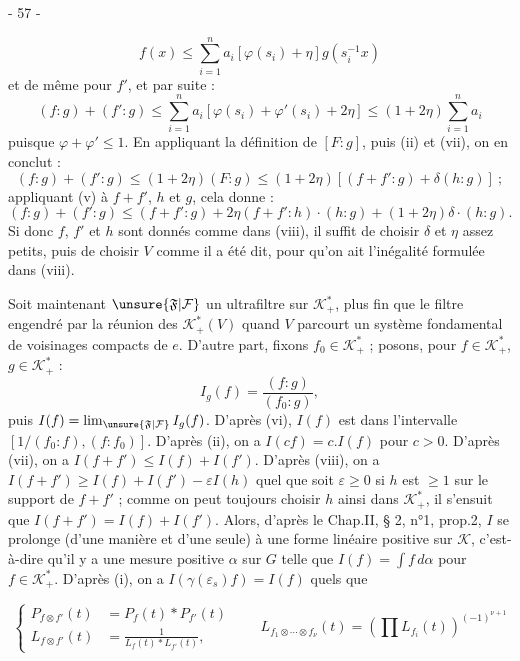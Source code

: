 
\begin{center}- 57 -\end{center}

\[
f(x)\leq\sum_{i=1}^{n}a_i[\varphi(s_i)+\eta]g(s_i^{-1}x)
\]
et de même pour $f'$, et par suite :
\[
(f:g)+(f':g)\leq\sum_{i=1}^{n}a_i[\varphi(s_i)+\varphi'(s_i)+2\eta]\leq(1+2\eta)\sum_{i=1}^{n}a_i
\]
puisque $\varphi+\varphi'\leq1$. En appliquant la définition de $[F:g]$, puis (ii) et (vii), on en conclut :
\[
(f:g)+(f':g)\leq(1+2\eta)(F:g)\leq(1+2\eta)[(f+f':g)+\delta(h:g)]\ ;
\]
appliquant (v) à $f+f'$, $h$ et $g$, cela donne :
\[
(f:g)+(f':g)\leq(f+f':g)+2\eta(f+f':h)\cdot(h:g)+(1+2\eta)\delta\cdot(h:g).
\]
Si donc $f$, $f'$ et $h$ sont donnés comme dans (viii), il suffit de choisir $\delta$ et $\eta$ assez petits, puis de choisir $V$ comme il a été dit, pour qu'on ait l'inégalité formulée dans (viii).

Soit maintenant $\unsure{\mathfrak{F}|\mathcal{F}}$ un ultrafiltre sur $\mathcal{K}^{*}_{+}$, plus fin que le filtre engendré par la réunion des $\mathcal{K}^{*}_{+}(V)$ quand $V$ parcourt un système fondamental de voisinages compacts de $e$. D'autre part, fixons $f_0\in\mathcal{K}^{*}_{+}$ ; posons, pour $f\in\mathcal{K}^{*}_{+}$, $g\in\mathcal{K}^{*}_{+}$ :
\[
I_g(f)=\frac{(f:g)}{(f_0:g)},
\]
puis $I(f)=\lim_{\unsure{\mathfrak{F}|\mathcal{F}}}I_g(f)$. D'après (vi), $I(f)$ est dans l'intervalle $[1/(f_0:f),(f:f_0)]$. D'après (ii), on a $I(cf)=c.I(f)$ pour $c>0$. D'après (vii), on a $I(f+f')\leq I(f)+I(f')$. D'après (viii), on a $I(f+f')\geq I(f)+I(f')-\varepsilon I(h)$ quel que soit $\varepsilon\geq0$ si $h$ est $\geq1$ sur le support de $f+f'$ ; comme on peut toujours choisir $h$ ainsi dans $\mathcal{K}^{*}_{+}$, il s'ensuit que $I(f+f')=I(f)+I(f')$. Alors, d'après le Chap.II, § 2, n°1, prop.2, $I$ se prolonge (d'une manière et d'une seule) à une forme linéaire positive sur $\mathcal{K}$, c'est-à-dire qu'il y a une mesure positive $\alpha$ sur $G$ telle que $I(f)=\int f\,d\alpha$ pour $f\in\mathcal{K}^{*}_{+}$. D'après (i), on a $I(\gamma(\varepsilon_s)f)=I(f)$ quels que

\[
\left\{\begin{aligned}
P_{f\otimes f'}(t)&=P_f(t)*P_{f'}(t)\\
L_{f\otimes f'}(t)&=\frac{1}{L_f(t)*L_{f'}(t)},
\end{aligned}\right.
\qquad L_{f_1\otimes\cdots\otimes f_{\nu}}(t)=\left(\prod L_{f_i}(t)\right)^{(-1)^{\nu+1}}
\]

